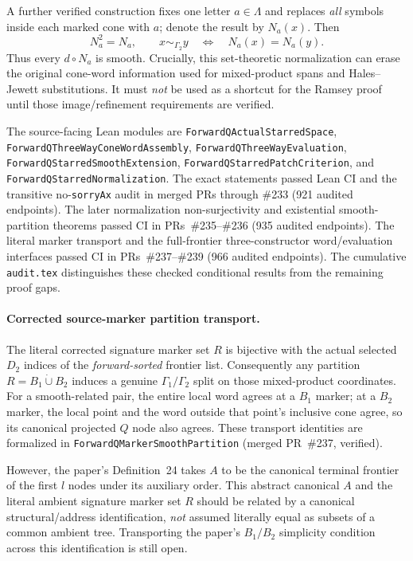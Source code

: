 \documentclass[11pt]{article}
\begin{document}
A further verified construction fixes one letter
\(a\in\Lambda\) and replaces \emph{all} symbols inside
each marked cone with \(a\); denote the result by \(N_a(x)\).
Then
\[
 N_a^2=N_a,\qquad
 x\sim_{\Gamma_2}y
 \quad\Longleftrightarrow\quad N_a(x)=N_a(y).
\]
Thus every \(d\circ N_a\) is smooth. Crucially, this
set-theoretic normalization can erase the original
cone-word information used for mixed-product spans
and Hales--Jewett substitutions. It must \emph{not}
be used as a shortcut for the Ramsey proof until
those image/refinement requirements are verified.

The source-facing Lean modules are
\texttt{ForwardQActualStarredSpace},
\texttt{ForwardQThreeWayConeWordAssembly},
\texttt{ForwardQThreeWayEvaluation},
\texttt{ForwardQStarredSmoothExtension},
\texttt{ForwardQStarredPatchCriterion}, and
\texttt{ForwardQStarredNormalization}.
The exact statements passed Lean CI and the transitive
no-\texttt{sorryAx} audit in merged PRs through
\#233 (921 audited endpoints). The later normalization non-surjectivity
and existential smooth-partition theorems passed CI in
PRs~\#235--\#236 (935 audited endpoints). The literal marker transport and the full-frontier
three-constructor word/evaluation interfaces passed CI in
PRs~\#237--\#239 (966 audited endpoints). The cumulative
\texttt{audit.tex} distinguishes these checked
conditional results from the remaining proof gaps.


\paragraph{Corrected source-marker partition transport.}
The literal corrected signature marker set \(R\) is
bijective with the actual selected \(D_2\) indices
of the \emph{forward-sorted} frontier list.
Consequently any partition \(R=B_1\dot\cup B_2\)
induces a genuine \(\Gamma_1/\Gamma_2\) split
on those mixed-product coordinates.
For a smooth-related pair, the entire local word
agrees at a \(B_1\) marker; at a \(B_2\)
marker, the local point and the word outside
that point's inclusive cone agree, so its
canonical projected \(Q\) node also agrees.
These transport identities are formalized in
\texttt{ForwardQMarkerSmoothPartition}
(merged PR~\#237, verified).

However, the paper's Definition~24
takes \(A\) to be the canonical terminal
frontier of the first \(l\) nodes under
its auxiliary order. This abstract canonical
\(A\) and the literal ambient signature
marker set \(R\) should be related by
a canonical structural/address identification,
\emph{not} assumed literally equal as
subsets of a common ambient tree.
Transporting the paper's \(B_1/B_2\)
simplicity condition across this
identification is still open.
\end{document}
